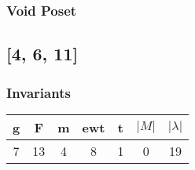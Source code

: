 \documentclass[a4paper]{article}
\begin{document}
\hfill\begin{minipage}{0.48\textwidth}
\subsubsection*{Void Poset}
\centering
{}
\end{minipage}
\newpage\subsection{[4, 6, 11]}
\noindent\begin{minipage}{0.6\textwidth}
\subsubsection*{Invariants}
\centering
\begin{tabular}{|c|c|c|c|c|c|c|}
\toprule
g & F & m & ewt & t & \(|M|\) & \(|\lambda|\) \\
\midrule
7 & 13 & 4 & 8 & 1 & 0 & 19 \\
\bottomrule
\end{tabular}
\end{minipage}%
\end{document}
